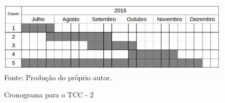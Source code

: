 \begin{figure}[!htb]
	\caption{Cronograma para o TCC - 2}
	\centering
	\includegraphics[scale=0.5]{images/cronograma.png}
	\label{fig:cronograma}{\\Fonte: Produção do próprio autor.}
\end{figure}

